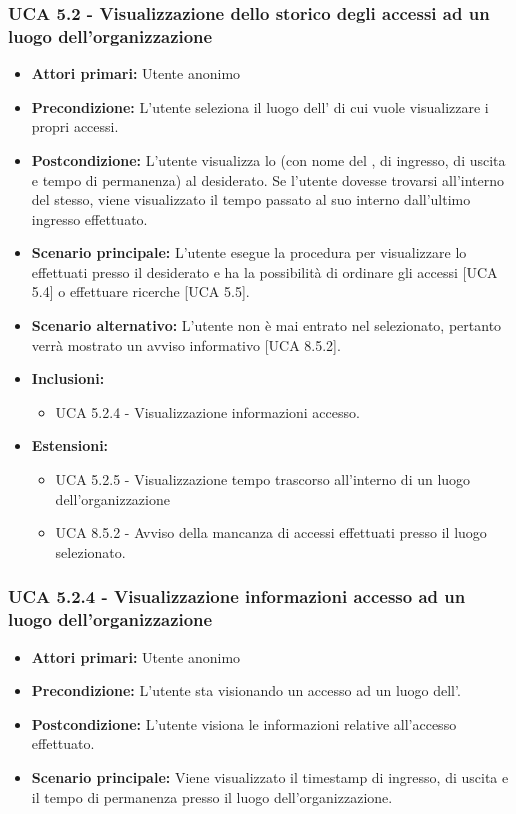 \subsubsection{UCA 5.2 - Visualizzazione dello storico degli accessi ad un luogo dell'organizzazione}
\begin{itemize}
    \item \textbf{Attori primari:} Utente anonimo
    \item \textbf{Precondizione:} L'utente seleziona il luogo dell' di cui vuole visualizzare i propri accessi.
    \item \textbf{Postcondizione:} L'utente visualizza lo  (con nome del ,  di ingresso, di uscita e tempo di permanenza) al  desiderato. Se l'utente dovesse trovarsi all'interno del  stesso, viene visualizzato il tempo passato al suo interno dall'ultimo ingresso effettuato.
    \item \textbf{Scenario principale:} L'utente esegue la procedura per visualizzare lo  effettuati presso il  desiderato e ha la possibilità di ordinare gli accessi [UCA 5.4] o effettuare ricerche [UCA 5.5].
    \item \textbf{Scenario alternativo:} L'utente non è mai entrato nel  selezionato, pertanto verrà mostrato un avviso informativo [UCA 8.5.2].
    \item \textbf{Inclusioni:}
    \begin{itemize}
        \item UCA 5.2.4 - Visualizzazione informazioni accesso.
    \end{itemize}
    \item \textbf{Estensioni:}
    \begin{itemize}
        \item UCA 5.2.5 - Visualizzazione tempo trascorso all'interno di un luogo dell'organizzazione
        \item UCA 8.5.2 - Avviso della mancanza di accessi effettuati presso il luogo selezionato.
    \end{itemize}
\end{itemize}

\subsubsection{UCA 5.2.4 - Visualizzazione informazioni accesso ad un luogo dell'organizzazione}
\begin{itemize}
	\item \textbf{Attori primari:} Utente anonimo
	\item \textbf{Precondizione:} L'utente sta visionando un accesso ad un luogo dell'.
	\item \textbf{Postcondizione:} L'utente visiona le informazioni relative all'accesso effettuato.
	\item \textbf{Scenario principale:} Viene visualizzato il timestamp di ingresso, di uscita e il tempo di permanenza presso il luogo dell'organizzazione.
\end{itemize}

